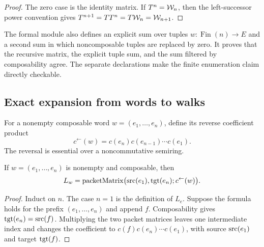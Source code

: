 \begin{proof}
The zero case is the identity matrix.  If $T^n=\mathcal W_n$, then the
left-successor power convention gives
$T^{n+1}=TT^n=T\mathcal W_n=\mathcal W_{n+1}$.
\end{proof}

\begin{remark}
The formal module also defines an explicit sum over tuples
$w:\operatorname{Fin}(n)\to E$ and a second sum in which noncomposable tuples
are replaced by zero.  It proves that the recursive matrix, the explicit tuple sum, and the sum
filtered by composability agree. The separate declarations make the finite
enumeration claim directly checkable.
\end{remark}

\subsection{Exact expansion from words to walks}

For a nonempty composable word $w=(e_1,\ldots,e_n)$, define its reverse
coefficient product
\[
  c^\leftarrow(w)=c(e_n)c(e_{n-1})\cdots c(e_1).
\]
The reversal is essential over a noncommutative semiring.

\begin{lemma}
\label{lem:word-endpoint}
If $w=(e_1,\ldots,e_n)$ is nonempty and composable, then
\[
  L_w
  =
  \operatorname{packetMatrix}
  \bigl(\operatorname{src}(e_1),\operatorname{tgt}(e_n);c^\leftarrow(w)\bigr).
\]
\end{lemma}

\begin{proof}
Induct on $n$.  The case $n=1$ is the definition of $L_e$.  Suppose the
formula holds for the prefix $(e_1,\ldots,e_n)$ and append $f$.  Composability
gives $\operatorname{tgt}(e_n)=\operatorname{src}(f)$.  Multiplying the two packet matrices leaves one
intermediate index and changes the coefficient to
$c(f)c(e_n)\cdots c(e_1)$, with source $\operatorname{src}(e_1)$ and target $\operatorname{tgt}(f)$.
\end{proof}

